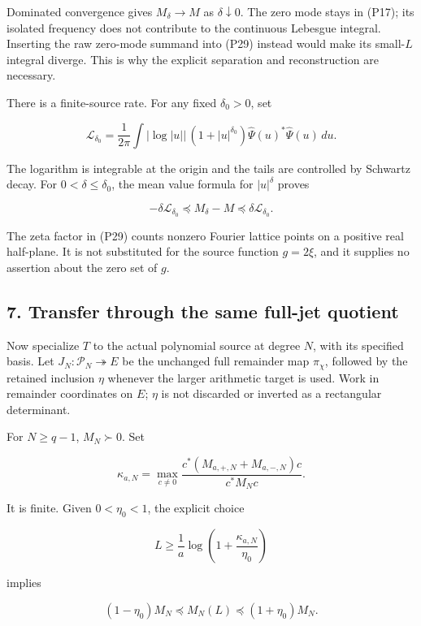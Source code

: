 Dominated convergence gives \(M_\delta\to M\) as \(\delta\downarrow0\). The zero mode stays in (P17); its isolated frequency does not contribute to the continuous Lebesgue integral. Inserting the raw zero-mode summand into (P29) instead would make its small-\(L\) integral diverge. This is why the explicit separation and reconstruction are necessary.

There is a finite-source rate. For any fixed \(\delta_0>0\), set

\[
\mathcal L_{\delta_0}=\frac1{2\pi}\int
|\log|u||\,(1+|u|^{\delta_0})
\widehat\Psi(u)^*\widehat\Psi(u)\,du.
\tag{P31}
\]

The logarithm is integrable at the origin and the tails are controlled by Schwartz decay. For \(0<\delta\le\delta_0\), the mean value formula for \(|u|^\delta\) proves

\[
-\delta\mathcal L_{\delta_0}\preceq M_\delta-M
\preceq\delta\mathcal L_{\delta_0}.
\tag{P32}
\]

The zeta factor in (P29) counts nonzero Fourier lattice points on a positive real half-plane. It is not substituted for the source function \(g=2\xi\), and it supplies no assertion about the zero set of \(g\).

\subsection{7. Transfer through the same full-jet quotient}\label{endpoint-periodized_original--transfer-through-the-same-full-jet-quotient}

Now specialize \(T\) to the actual polynomial source at degree \(N\), with its specified basis. Let \(J_N:\mathcal P_N\twoheadrightarrow E\) be the unchanged full remainder map \(\pi_\chi\), followed by the retained inclusion \(\eta\) whenever the larger arithmetic target is used. Work in remainder coordinates on \(E\); \(\eta\) is not discarded or inverted as a rectangular determinant.

For \(N\ge q-1\), \(M_N\succ0\). Set

\[
\kappa_{a,N}=
\max_{c\ne0}\frac{c^*(M_{a,+,N}+M_{a,-,N})c}{c^*M_Nc}.
\tag{P33}
\]

It is finite. Given \(0<\eta_0<1\), the explicit choice

\[
L\ge\frac1a\log\left(1+\frac{\kappa_{a,N}}{\eta_0}\right)
\tag{P34}
\]

implies

\[
(1-\eta_0)M_N\preceq M_N(L)\preceq(1+\eta_0)M_N.
\tag{P35}
\]

